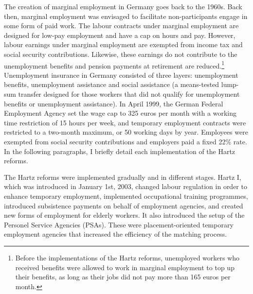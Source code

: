 \documentclass[12pt, a4paper]{article}
\begin{document}
The creation of marginal employment in Germany goes back to the 1960s. Back then, marginal employment was envisaged to facilitate non-participants engage in some form of paid work. The labour contracts under marginal employment are designed for low-pay employment and have a cap on hours and pay. However, labour earnings under marginal employment are exempted from income tax and social security contributions. Likewise, these earnings do not contribute to the unemployment benefits and pension payments at retirement are reduced.\footnote{Before the implementations of the Hartz reforms, unemployed workers who received benefits were allowed to work in marginal employment to top up their benefits, as long as their jobs did not pay more than 165 euros per month.} Unemployment insurance in Germany consisted of three layers: unemployment benefits, unemployment assistance and social assistance (a means-tested lump-sum transfer designed for those workers that did not qualify for unemployment benefits or unemployment assistance). In April 1999, the German Federal Employment Agency set the wage cap to 325 euros per month with a working time restriction of 15 hours per week, and temporary employment contracts were restricted to a two-month maximum, or 50 working days by year. Employees were exempted from social security contributions and employers paid a fixed 22\% rate. In the following paragraphs, I briefly detail each implementation of the Hartz reforms.

The Hartz reforms were implemented gradually and in different stages. Hartz I, which was introduced in January 1st, 2003, changed labour regulation in order to enhance temporary employment, implemented occupational training programmes, introduced subsistence payments on behalf of employment agencies, and created new forms of employment for elderly workers. It also introduced the setup of the Personel Service Agencies (PSAs). These were placement-oriented temporary employment agencies that increased the efficiency of the matching process. 
\end{document}
